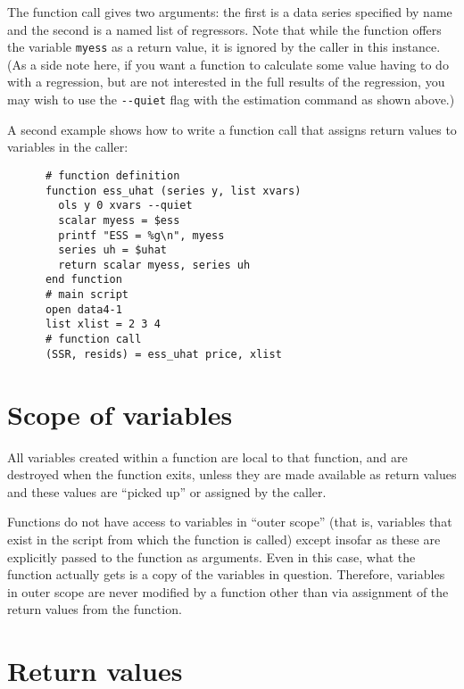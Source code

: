       The function call gives two arguments: the first is a data series
      specified by name and the second is a named list of regressors.  Note that
      while the function offers the variable \verb+myess+ as a
      return value, it is ignored by the caller in this instance.
    (As a side note here, if you want a function to calculate some value
      having to do with a regression, but are not interested in the full results
      of the regression, you may wish to use the \verb+--quiet+ flag
      with the estimation command as shown above.)
    
      A second example shows how to write a function call that assigns return
      values to variables in the caller:
    
\begin{verbatim}
      # function definition
      function ess_uhat (series y, list xvars)
        ols y 0 xvars --quiet
        scalar myess = $ess
        printf "ESS = %g\n", myess
        series uh = $uhat
        return scalar myess, series uh
      end function
      # main script
      open data4-1
      list xlist = 2 3 4
      # function call
      (SSR, resids) = ess_uhat price, xlist\end{verbatim}


\section{Scope of variables}
\label{func-scope}

All variables created within a function are local to that function,
      and are destroyed when the function exits, unless they are made available
      as return values and these values are ``picked up'' or assigned
      by the caller.
    
      Functions do not have access to variables in ``outer scope''
      (that is, variables that exist in the script from which the function is
      called) except insofar as these are explicitly passed to the function as
      arguments.  Even in this case, what the function actually gets is a copy
      of the variables in question.  Therefore, variables in outer scope are
      never modified by a function other than via assignment of the return
      values from the function.
    

\section{Return values}
\label{func-return}



